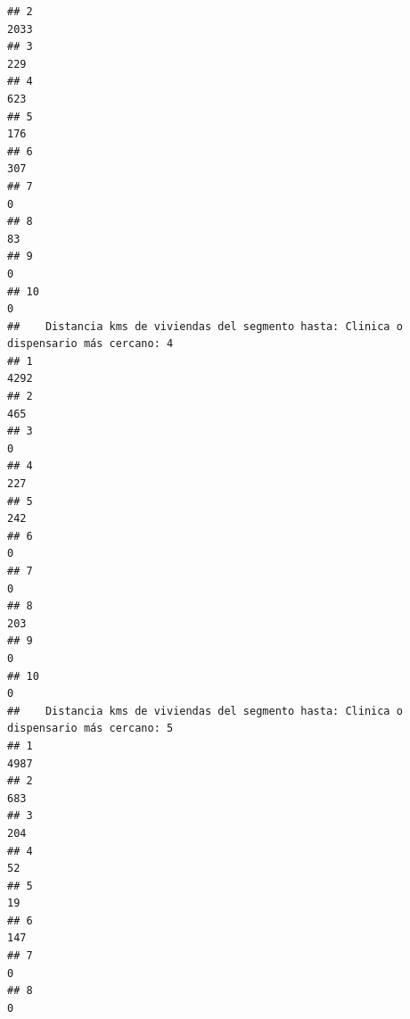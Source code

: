 \documentclass[11pt,]{article}
\begin{document}
\begin{verbatim}
## 2                                                                                 2033
## 3                                                                                  229
## 4                                                                                  623
## 5                                                                                  176
## 6                                                                                  307
## 7                                                                                    0
## 8                                                                                   83
## 9                                                                                    0
## 10                                                                                   0
##    Distancia kms de viviendas del segmento hasta: Clinica o dispensario más cercano: 4
## 1                                                                                 4292
## 2                                                                                  465
## 3                                                                                    0
## 4                                                                                  227
## 5                                                                                  242
## 6                                                                                    0
## 7                                                                                    0
## 8                                                                                  203
## 9                                                                                    0
## 10                                                                                   0
##    Distancia kms de viviendas del segmento hasta: Clinica o dispensario más cercano: 5
## 1                                                                                 4987
## 2                                                                                  683
## 3                                                                                  204
## 4                                                                                   52
## 5                                                                                   19
## 6                                                                                  147
## 7                                                                                    0
## 8                                                                                    0

\end{verbatim}
\end{document}
